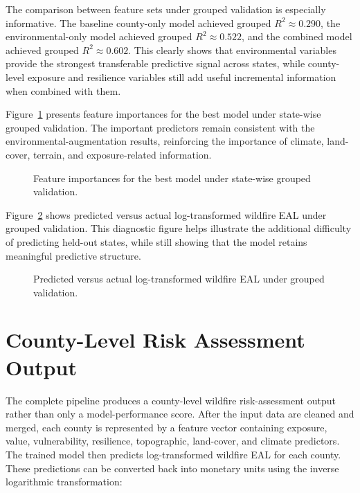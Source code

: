 The comparison between feature sets under grouped validation is especially informative. The baseline county-only model achieved grouped $R^2 \approx 0.290$, the environmental-only model achieved grouped $R^2 \approx 0.522$, and the combined model achieved grouped $R^2 \approx 0.602$. This clearly shows that environmental variables provide the strongest transferable predictive signal across states, while county-level exposure and resilience variables still add useful incremental information when combined with them.

Figure~\ref{fig:grouped_model_feature_importance} presents feature importances for the best model under state-wise grouped validation. The important predictors remain consistent with the environmental-augmentation results, reinforcing the importance of climate, land-cover, terrain, and exposure-related information.

\begin{figure}[htbp]
    \centering
    \caption{Feature importances for the best model under state-wise grouped validation.}
    \label{fig:grouped_model_feature_importance}
\end{figure}

Figure~\ref{fig:grouped_predicted_vs_actual} shows predicted versus actual log-transformed wildfire EAL under grouped validation. This diagnostic figure helps illustrate the additional difficulty of predicting held-out states, while still showing that the model retains meaningful predictive structure.

\begin{figure}[htbp]
    \centering
    \caption{Predicted versus actual log-transformed wildfire EAL under grouped validation.}
    \label{fig:grouped_predicted_vs_actual}
\end{figure}

\section{County-Level Risk Assessment Output}
\label{sec:pipeline_output}

The complete pipeline produces a county-level wildfire risk-assessment output rather than only a model-performance score. After the input data are cleaned and merged, each county is represented by a feature vector containing exposure, value, vulnerability, resilience, topographic, land-cover, and climate predictors. The trained model then predicts log-transformed wildfire EAL for each county. These predictions can be converted back into monetary units using the inverse logarithmic transformation:

